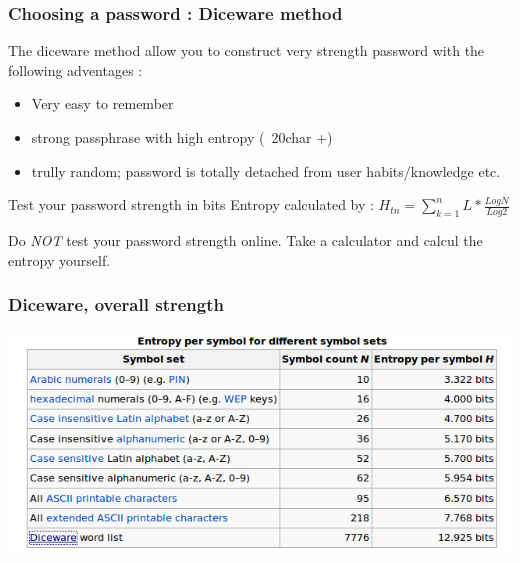 \begin{frame}
\frametitle{Choosing a password : Diceware method}
The diceware method allow you to construct very strength password with the
following adventages :
\begin{itemize}
\item Very easy to remember
\item strong passphrase with high entropy (~20char +)
\item trully random; password is totally detached from user habits/knowledge
etc.
\end{itemize}
\begin{block}{Test your password strength in bits}
Entropy calculated by : $H_{tn}=\sum_{k=1}^nL*\frac{Log N}{Log 2}$
\end{block}
Do \emph{NOT} test your password strength online.
Take a calculator and calcul the entropy yourself.
\end{frame}
\begin{frame}
\frametitle{Diceware, overall strength}
\includegraphics[width=0.8\linewidth]{./materials/diceware}
\end{frame}
